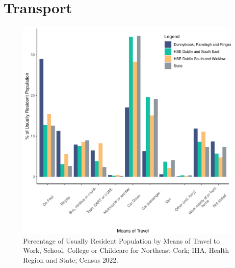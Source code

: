 \documentclass{article}
\begin{document}
\section{Transport}\label{sect:Trans}
\begin{figure}[H]
	\centering
	\includegraphics[width = 120mm]{../figures/TravelED.pdf}
	\caption{Percentage of Usually Resident Population by Means of Travel to Work, School, College or Childcare for Northeast Cork; IHA, Health Region and State; Census 2022.}
	\label{fig:vbnv}
	\end{figure}
\end{document}
